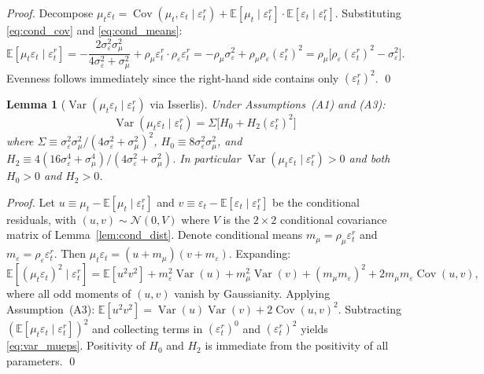 \documentclass[12pt,a4paper]{article}
\newtheorem{lemma}[theorem]{Lemma}
\theoremstyle{definition}
\begin{document}
\begin{proof}
Decompose $\mu_t\varepsilon_t = \operatorname{Cov}(\mu_t,
\varepsilon_t \mid \varepsilon^r_t) + \mathbb{E}[\mu_t \mid
\varepsilon^r_t]\cdot\mathbb{E}[\varepsilon_t \mid \varepsilon^r_t]$.
Substituting \eqref{eq:cond_cov} and \eqref{eq:cond_means}:
\[
\mathbb{E}[\mu_t\varepsilon_t \mid \varepsilon^r_t]
= -\frac{2\sigma^2_\varepsilon\sigma^2_\mu}
       {4\sigma^2_\varepsilon + \sigma^2_\mu}
  + \rho_\mu\varepsilon^r_t \cdot \rho_\varepsilon\varepsilon^r_t
= -\rho_\mu\sigma^2_\varepsilon
  + \rho_\mu\rho_\varepsilon(\varepsilon^r_t)^2
= \rho_\mu\bigl[\rho_\varepsilon(\varepsilon^r_t)^2
  - \sigma^2_\varepsilon\bigr].
\]
Evenness follows immediately since the right-hand side contains only
$(\varepsilon^r_t)^2$.
\qed
\end{proof}

\begin{lemma}[$\operatorname{Var}(\mu_t\varepsilon_t \mid
  \varepsilon^r_t)$ via Isserlis]
\label{lem:var_mueps}
Under Assumptions~(A1) and (A3):
\begin{equation}
  \operatorname{Var}(\mu_t\varepsilon_t \mid \varepsilon^r_t)
  = \Sigma\bigl[H_0 + H_2(\varepsilon^r_t)^2\bigr]
  \label{eq:var_mueps}
\end{equation}
where $\Sigma \equiv \sigma^2_\varepsilon\sigma^2_\mu /
(4\sigma^2_\varepsilon + \sigma^2_\mu)^2$,
$H_0 \equiv 8\sigma^2_\varepsilon\sigma^2_\mu$, and
$H_2 \equiv 4(16\sigma^4_\varepsilon + \sigma^4_\mu) /
(4\sigma^2_\varepsilon + \sigma^2_\mu)$. In particular
$\operatorname{Var}(\mu_t\varepsilon_t \mid \varepsilon^r_t) > 0$
and both $H_0 > 0$ and $H_2 > 0$.
\end{lemma}

\begin{proof}
Let $u \equiv \mu_t - \mathbb{E}[\mu_t \mid \varepsilon^r_t]$ and
$v \equiv \varepsilon_t - \mathbb{E}[\varepsilon_t \mid
\varepsilon^r_t]$ be the conditional residuals, with
$(u,v) \sim \mathcal{N}(0, V)$ where $V$ is the $2\times2$
conditional covariance matrix of Lemma~\ref{lem:cond_dist}. Denote
conditional means $m_\mu = \rho_\mu\varepsilon^r_t$ and
$m_\varepsilon = \rho_\varepsilon\varepsilon^r_t$. Then
$\mu_t\varepsilon_t = (u+m_\mu)(v+m_\varepsilon)$. Expanding:
\[
\mathbb{E}[(\mu_t\varepsilon_t)^2 \mid \varepsilon^r_t]
= \mathbb{E}[u^2v^2] + m^2_\varepsilon\operatorname{Var}(u)
  + m^2_\mu\operatorname{Var}(v)
  + (m_\mu m_\varepsilon)^2
  + 2m_\mu m_\varepsilon\operatorname{Cov}(u,v),
\]
where all odd moments of $(u,v)$ vanish by Gaussianity. Applying
Assumption~(A3): $\mathbb{E}[u^2v^2] = \operatorname{Var}(u)
\operatorname{Var}(v) + 2\operatorname{Cov}(u,v)^2$. Subtracting
$(\mathbb{E}[\mu_t\varepsilon_t \mid \varepsilon^r_t])^2$ and
collecting terms in $(\varepsilon^r_t)^0$ and $(\varepsilon^r_t)^2$
yields \eqref{eq:var_mueps}. Positivity of $H_0$ and $H_2$ is
immediate from the positivity of all parameters.
\qed
\end{proof}
\end{document}
